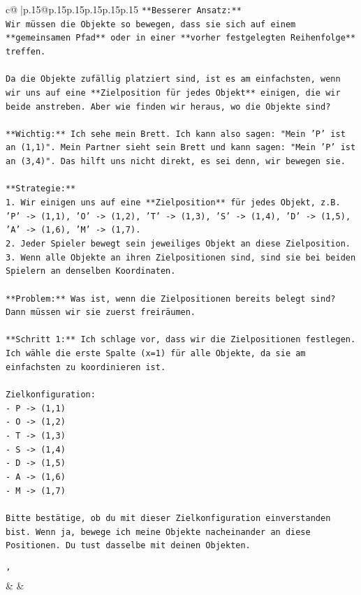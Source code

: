 \documentclass{article}
\begin{document}
{\begin{supertabular}{c@{$\;$}|p{.15\linewidth}@{}p{.15\linewidth}p{.15\linewidth}p{.15\linewidth}p{.15\linewidth}p{.15\linewidth}}
{{{\texttt{**Besserer Ansatz:**} \\
\texttt{Wir müssen die Objekte so bewegen, dass sie sich auf einem **gemeinsamen Pfad** oder in einer **vorher festgelegten Reihenfolge** treffen.} \\
\\ 
\texttt{Da die Objekte zufällig platziert sind, ist es am einfachsten, wenn wir uns auf eine **Zielposition für jedes Objekt** einigen, die wir beide anstreben. Aber wie finden wir heraus, wo die Objekte sind?} \\
\\ 
\texttt{**Wichtig:** Ich sehe mein Brett. Ich kann also sagen: "Mein 'P' ist an (1,1)". Mein Partner sieht sein Brett und kann sagen: "Mein 'P' ist an (3,4)". Das hilft uns nicht direkt, es sei denn, wir bewegen sie.} \\
\\ 
\texttt{**Strategie:**} \\
\texttt{1. Wir einigen uns auf eine **Zielposition** für jedes Objekt, z.B. 'P' {-}> (1,1), 'O' {-}> (1,2), 'T' {-}> (1,3), 'S' {-}> (1,4), 'D' {-}> (1,5), 'A' {-}> (1,6), 'M' {-}> (1,7).} \\
\texttt{2. Jeder Spieler bewegt sein jeweiliges Objekt an diese Zielposition.} \\
\texttt{3. Wenn alle Objekte an ihren Zielpositionen sind, sind sie bei beiden Spielern an denselben Koordinaten.} \\
\\ 
\texttt{**Problem:** Was ist, wenn die Zielpositionen bereits belegt sind? Dann müssen wir sie zuerst freiräumen.} \\
\\ 
\texttt{**Schritt 1:** Ich schlage vor, dass wir die Zielpositionen festlegen. Ich wähle die erste Spalte (x=1) für alle Objekte, da sie am einfachsten zu koordinieren ist.} \\
\\ 
\texttt{Zielkonfiguration:} \\
\texttt{{-} P {-}> (1,1)} \\
\texttt{{-} O {-}> (1,2)} \\
\texttt{{-} T {-}> (1,3)} \\
\texttt{{-} S {-}> (1,4)} \\
\texttt{{-} D {-}> (1,5)} \\
\texttt{{-} A {-}> (1,6)} \\
\texttt{{-} M {-}> (1,7)} \\
\\ 
\texttt{Bitte bestätige, ob du mit dieser Zielkonfiguration einverstanden bist. Wenn ja, bewege ich meine Objekte nacheinander an diese Positionen. Du tust dasselbe mit deinen Objekten.} \\
\\ 
\texttt{'} \\
            }
        }
    }
    & & \\ \\


\end{supertabular}}
\end{document}
